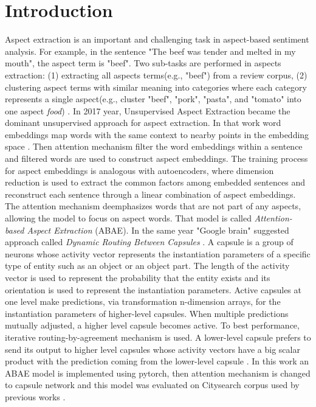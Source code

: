 \documentclass{article}
\begin{document}
\section{Introduction}
Aspect extraction is an important and challenging task in aspect-based sentiment analysis. For example, in the sentence "The beef was tender and melted in my mouth", the aspect term is "beef". Two sub-tasks are performed in aspects extraction: (1) extracting all aspects terms(e.g., "beef") from a review corpus, (2) clustering aspect terms with similar meaning into categories where each category represents a single aspect(e.g., cluster "beef", "pork", "pasta", and "tomato" into one aspect \textit{food}) \cite{He2018ABAE}. In 2017 year, Unsupervised Aspect Extraction \cite{He2018ABAE} became the dominant unsupervised approach for aspect extraction. In that work word embeddings map words with the same context to nearby points in the embedding space \cite{Mikolov2013W2V}. Then attention mechanism \cite{Bahdanau2015NMT} filter the word embeddings within a sentence and filtered words are used to construct aspect embeddings. The training process for aspect embeddings is analogous with autoencoders, where dimension reduction is used to extract the common factors among embedded sentences and reconstruct each sentence through a linear combination of aspect embeddings. The attention mechanism deemphasizes words that are not part of any aspects, allowing the model to focus on aspect words. That model is called \textit{Attention-based Aspect Extraction} (ABAE). In the same year "Google brain" suggested approach called \textit{Dynamic Routing Between Capsules} \cite{Hinton2017DRBC}. A capsule is a group of neurons whose activity vector represents the instantiation parameters of a specific type of entity such as an object or an object part. The length of the activity vector is used to represent the probability that the entity exists and its orientation is used to represent the instantiation parameters. Active capsules at one level make predictions, via transformation n-dimension arrays, for the instantiation parameters of higher-level capsules. When multiple predictions mutually adjusted, a higher level capsule becomes active. To best performance, iterative routing-by-agreement mechanism is used. A lower-level capsule prefers to send its output to higher level capsules whose activity vectors have a big scalar product with the prediction coming from the lower-level capsule \cite{Hinton2017DRBC}. In this work an ABAE model is implemented using pytorch, then attention mechanism is changed to capsule network and this model was evaluated on Citysearch corpus used by previous works \cite{Ganu2009BeyondTheStars, Brody2010UAS, Zhao2010JMA, He2018ABAE}.
\end{document}
